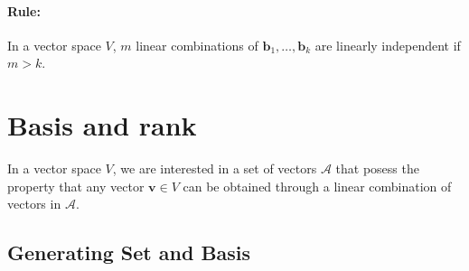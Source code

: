 \documentclass[12pt]{article}
\newcommand{\vecs}[2]{{\bm{#1}_1, \dots, \bm{#1}_#2}}
\newcommand{\xrule}[1]{\paragraph{\colorbox{#1!30}{\textbf{Rule:}}}}
\begin{document}
\xrule{red} In a vector space $V$, $m$ linear combinations of $\vecs{b}{k}$ are linearly independent if $m > k$. 

\section{Basis and rank}

In a vector space $V$, we are interested in a set of vectors $\mathcal{A}$ that posess the property that any vector $\bm{v} \in V$ can be obtained through a linear combination of vectors in $\mathcal{A}$.

\subsection{Generating Set and Basis}
\end{document}
